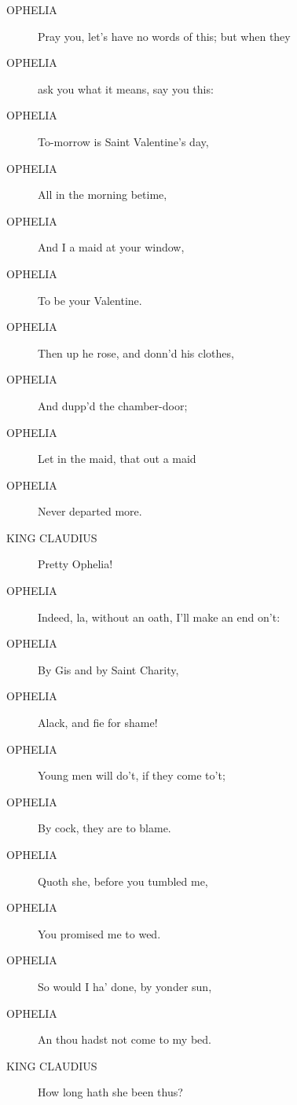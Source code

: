 \documentclass{article}
\begin{document}
\begin{description}
            
\item[OPHELIA] Pray you, let's have no words of this; but when they
\item[OPHELIA] ask you what it means, say you this:
\item[OPHELIA] To-morrow is Saint Valentine's day,
\item[OPHELIA] All in the morning betime,
\item[OPHELIA] And I a maid at your window,
\item[OPHELIA] To be your Valentine.
\item[OPHELIA] Then up he rose, and donn'd his clothes,
\item[OPHELIA] And dupp'd the chamber-door;
\item[OPHELIA] Let in the maid, that out a maid
\item[OPHELIA] Never departed more.
\end{description}
          
\begin{description}
            
\item[KING CLAUDIUS] Pretty Ophelia!
\end{description}
          
\begin{description}
            
\item[OPHELIA] Indeed, la, without an oath, I'll make an end on't:
\item[OPHELIA] By Gis and by Saint Charity,
\item[OPHELIA] Alack, and fie for shame!
\item[OPHELIA] Young men will do't, if they come to't;
\item[OPHELIA] By cock, they are to blame.
\item[OPHELIA] Quoth she, before you tumbled me,
\item[OPHELIA] You promised me to wed.
\item[OPHELIA] So would I ha' done, by yonder sun,
\item[OPHELIA] An thou hadst not come to my bed.
\end{description}
          
\begin{description}
            
\item[KING CLAUDIUS] How long hath she been thus?
\end{description}
          
\end{document}
